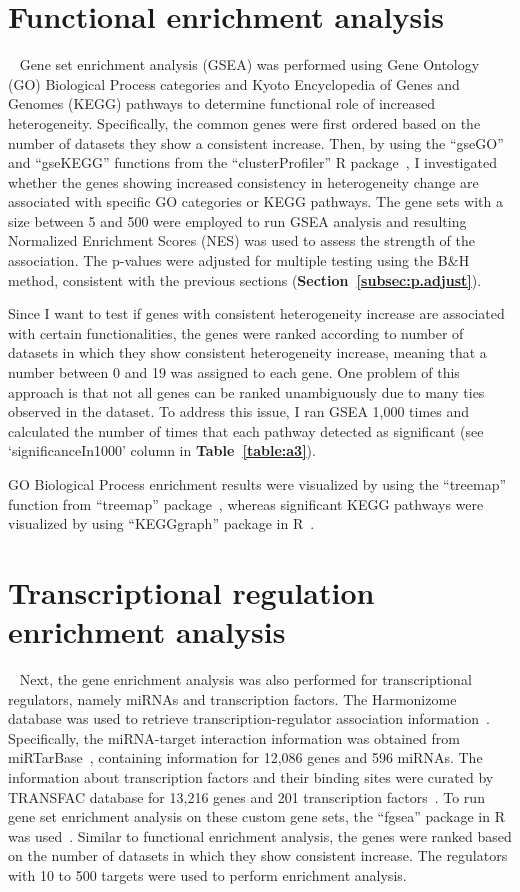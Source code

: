 \section{Functional enrichment analysis}~\label{sec:func}
Gene set enrichment analysis (GSEA) was performed using Gene Ontology (GO) Biological Process categories and Kyoto Encyclopedia of Genes and Genomes (KEGG) pathways 
to determine functional role of increased heterogeneity.
Specifically, the common genes were first ordered based on the number of datasets they show a consistent increase.
Then, by using the ``gseGO'' and ``gseKEGG'' functions from the ``clusterProfiler'' R package~\cite{clusterProfiler}, 
I investigated whether the genes showing increased consistency in heterogeneity change are associated with specific GO categories or KEGG pathways.
The gene sets with a size between 5 and 500 were employed to run GSEA analysis and resulting Normalized Enrichment Scores (NES) was used to assess the strength of the association.
The p-values were adjusted for multiple testing using the B{\&}H method, consistent with the previous sections (\textbf{Section~\ref{subsec:p.adjust}}).

Since I want to test if genes with consistent heterogeneity increase are associated with certain functionalities, 
the genes were ranked according to number of datasets in which they show consistent heterogeneity increase, meaning that a number between 0 and 19 was assigned to each gene.
One problem of this approach is that not all genes can be ranked unambiguously due to many ties observed in the dataset. 
To address this issue, I ran GSEA 1,000 times and calculated the number of times that each pathway detected as significant (see `significanceIn1000' column in \textbf{Table~\ref{table:a3}}).

GO Biological Process enrichment results were visualized by using the ``treemap'' function from ``treemap'' package~\cite{treemap2021}, 
whereas significant KEGG pathways were visualized by using ``KEGGgraph'' package in R~\cite{KEGGgraph}.

\section{Transcriptional regulation enrichment analysis}~\label{sec:reg.enrich}
Next, the gene enrichment analysis was also performed for transcriptional regulators, namely miRNAs and transcription factors. 
The Harmonizome database was used to retrieve transcription-regulator association information~\cite{Rouillard2016}.
Specifically, the miRNA-target interaction information was obtained from miRTarBase~\cite{Chou2016}, containing information for 12,086 genes and 596 miRNAs.
The information about transcription factors and their binding sites were curated by TRANSFAC database for 13,216 genes and 201 transcription factors~\cite{Matys2006}.
To run gene set enrichment analysis on these custom gene sets, the ``fgsea'' package in R was used~\cite{fgsea}.
Similar to functional enrichment analysis, the genes were ranked based on the number of datasets in which they show consistent increase.
The regulators with 10 to 500 targets were used to perform enrichment analysis.

